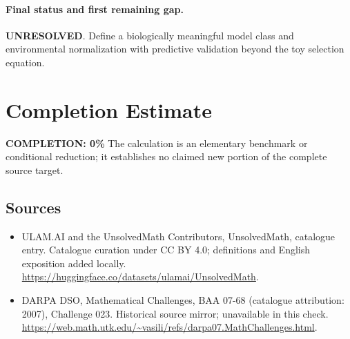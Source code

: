 \documentclass[11pt]{article}
\begin{document}
\paragraph{Final status and first remaining gap.}
\textbf{UNRESOLVED}. Define a biologically meaningful model class and environmental normalization with predictive validation beyond the toy selection equation.

\section{Completion Estimate}
\noindent\textbf{COMPLETION: 0\%}
The calculation is an elementary benchmark or conditional reduction; it establishes no claimed new portion of the complete source target.

\subsection{Sources}
\begin{itemize}
\item[\hypertarget{source:statement:1}{S1}] ULAM.AI and the UnsolvedMath Contributors, UnsolvedMath, catalogue entry. Catalogue curation under CC BY 4.0; definitions and English exposition added locally.
\url{https://huggingface.co/datasets/ulamai/UnsolvedMath}.
\item[\hypertarget{source:statement:2}{S2}] DARPA DSO, Mathematical Challenges, BAA 07-68 (catalogue attribution: 2007), Challenge 023. Historical source mirror; unavailable in this check.
\url{https://web.math.utk.edu/~vasili/refs/darpa07.MathChallenges.html}.
\end{itemize}
\label{end:statement}
\end{document}
